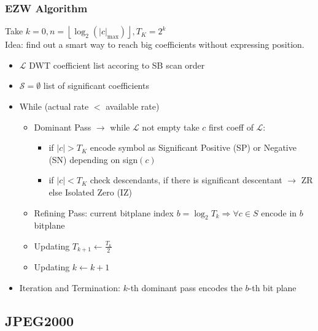 \subsubsection{EZW Algorithm}
Take $k=0, n= \left\lfloor \log_2\left(|c|_{\max}\right)\right\rfloor, T_K = 2^k$\\
Idea: find out a smart way to reach big coefficients without expressing position.
\begin{itemize}
    \item $\mathcal{L}$ DWT coefficient list accoring to SB scan order
    \item $\mathcal{S} = \emptyset$ list of significant coefficients
    \item While (actual rate $<$ available rate)
    \begin{itemize}
        \item Dominant Pass $\to$ while $\mathcal{L}$ not empty take $c$ first coeff of $\mathcal{L}$:
        \begin{itemize}
            \item if $|c| > T_K$ encode symbol as Significant Positive (SP) or Negative (SN) depending on sign$(c)$
            \item if $|c| < T_K$ check descendants, if there is significant descentant $\to$ ZR else Isolated Zero (IZ)
        \end{itemize}
        \item Refining Pass: current bitplane index $b = \log_2T_k \Rightarrow \forall c \in S$ encode in $b$ bitplane
        \item Updating $T_{k+1} \leftarrow \frac{T_k}{2}$
        \item Updating $k \leftarrow k +1$
    \end{itemize}
    \item Iteration and Termination: $k$-th dominant pass encodes the $b$-th bit plane
\end{itemize}
\subsection{JPEG2000}
